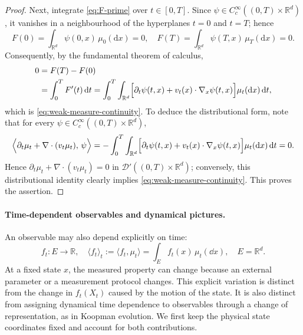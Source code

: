 \documentclass[12pt,a4paper,oneside]{book}
\begin{document}
\begin{proof}
Next, integrate \eqref{eq:F-prime} over $t\in[0,T]$. Since $\psi\in C_c^\infty((0,T)\times\mathbb{R}^d)$, it vanishes in 
a neighbourhood of the hyperplanes $t=0$ and $t=T$; hence
\begin{equation*}
    F(0)=\int_{\mathbb{R}^d}\psi(0,x)\,\mu_0(\mathrm{d}x)=0, \quad
    F(T)=\int_{\mathbb{R}^d}\psi(T,x)\,\mu_T(\mathrm{d}x)=0.
\end{equation*}
Consequently, by the fundamental theorem of calculus,
\begin{equation*}
    \begin{aligned}
        0 &= F(T)-F(0) \\
          &= \int_0^T F'(t)\,\mathrm{d}t
           = \int_0^T\int_{\mathbb{R}^d}
            \Bigl[
                \partial_t\psi(t,x)+v_t(x)\cdot\nabla_x\psi(t,x)
            \Bigr]\mu_t(\mathrm{d}x)\,\mathrm{d}t,
    \end{aligned}
\end{equation*}
which is \eqref{eq:weak-measure-continuity}. To deduce the distributional form, note that for every
$\psi\in C_c^\infty((0,T)\times\mathbb{R}^d)$,
\begin{equation*}
    \Bigl\langle \partial_t\mu_t+\nabla\cdot(v_t\mu_t),\,\psi \Bigr\rangle
    = -\int_0^T\int_{\mathbb{R}^d}
        \Bigl[
            \partial_t\psi(t,x)+v_t(x)\cdot\nabla_x\psi(t,x)
        \Bigr]\mu_t(\mathrm{d}x)\,\mathrm{d}t
    = 0.
\end{equation*}
Hence $\partial_t\mu_t+\nabla\cdot(v_t\mu_t)=0$ in $\mathcal{D}'((0,T)\times\mathbb{R}^d)$; conversely, this distributional 
identity clearly implies \eqref{eq:weak-measure-continuity}. This proves the assertion.
\end{proof}

\paragraph{Time-dependent observables and dynamical pictures.}

An observable may also depend explicitly on time:
\begin{equation*}
    f_t:E\to\mathbb R, \quad
    \langle f_t\rangle_t :=\langle f_t,\mu_t\rangle = \int_E f_t(x)\,\mu_t(\dd x), \quad E=\mathbb R^d.
\end{equation*}
At a fixed state $x$, the measured property can change because an external parameter or a measurement protocol changes.
This explicit variation is distinct from the change in $f_t(X_t)$ caused by the motion of the state.
It is also distinct from assigning dynamical time dependence to observables through a change of representation,
as in Koopman evolution. We first keep the physical state coordinates fixed and account for both contributions.
\end{document}
